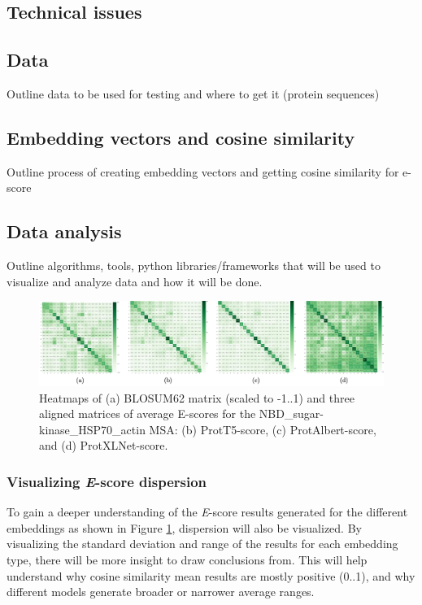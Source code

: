 \documentclass[
	letterpaper, %
	10pt, %
]{LTJournalArticle}
\begin{document}
\subsection{Technical issues}

\subsection{Data}
Outline data to be used for testing and where to get it (protein sequences)

\subsection{Embedding vectors and cosine similarity}
Outline process of creating embedding vectors and getting cosine similarity for e-score

\subsection{Data analysis}
Outline algorithms, tools, python libraries/frameworks that will be used to visualize and analyze data and how it will be done.

\begin{figure} %
	\includegraphics[width=\linewidth]{Figures/Escorematrices.jpeg}
	\caption{Heatmaps of (a) BLOSUM62 matrix (scaled to -1..1) and three aligned matrices of average E-scores for the NBD\_sugar-kinase\_HSP70\_actin MSA: (b) ProtT5-score, (c) ProtAlbert-score, and (d) ProtXLNet-score.}
	\label{fig:escoreheatmap}
\end{figure}

\subsubsection{Visualizing \textit{E}-score dispersion}

To gain a deeper understanding of the \textit{E}-score results generated for the different embeddings as shown in Figure \ref{fig:escoreheatmap}, dispersion will also be visualized. By visualizing the standard deviation and range of the results for each embedding type, there will be more insight to draw conclusions from. This will help understand why cosine similarity mean results are mostly positive (0..1), and why different models generate broader or narrower average ranges.
\end{document}
